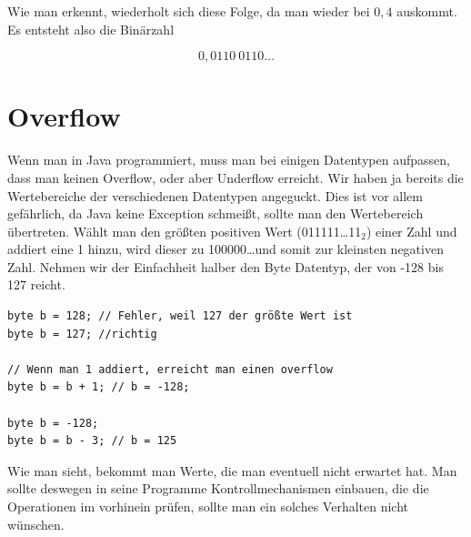 Wie man erkennt, wiederholt sich diese Folge, da man wieder bei $0,4$ auskommt. Es entsteht also die Binärzahl

$$0,0110\ 0110 \dots$$

\section{Overflow}

Wenn man in Java programmiert, muss man bei einigen Datentypen aufpassen, dass man keinen Overflow, oder aber Underflow erreicht. Wir haben ja bereits die Wertebereiche der verschiedenen Datentypen angeguckt. Dies ist vor allem gefährlich, da Java keine Exception schmeißt, sollte man den Wertebereich übertreten. Wählt man den größten positiven Wert (011111\dots11$_{2}$) einer Zahl und addiert eine 1 hinzu, wird dieser zu 100000\dots und somit zur kleinsten negativen Zahl. Nehmen wir der Einfachheit halber den Byte Datentyp, der von -128 bis 127 reicht.

\begin{lstlisting}
byte b = 128; // Fehler, weil 127 der größte Wert ist
byte b = 127; //richtig

// Wenn man 1 addiert, erreicht man einen overflow
byte b = b + 1; // b = -128;

byte b = -128;
byte b = b - 3; // b = 125
\end{lstlisting}

Wie man sieht, bekommt man Werte, die man eventuell nicht erwartet hat. Man sollte deswegen in seine Programme Kontrollmechanismen einbauen, die die Operationen im vorhinein prüfen, sollte man ein solches Verhalten nicht wünschen.